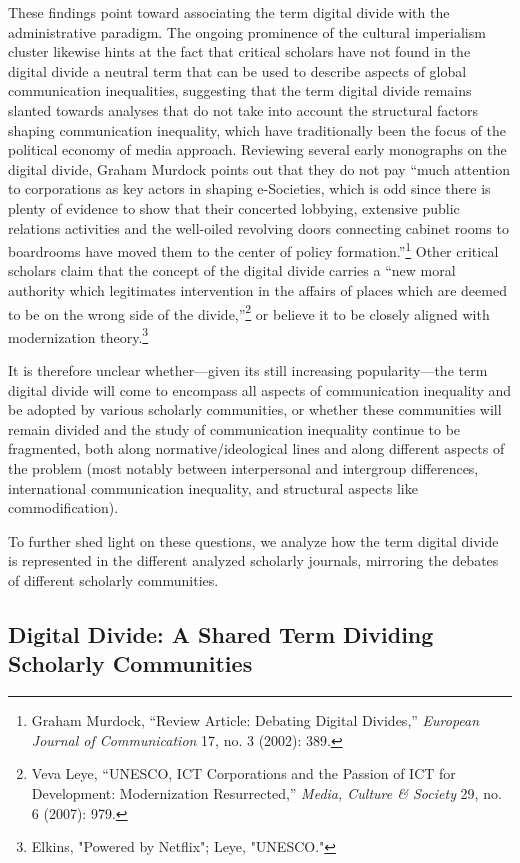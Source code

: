 \documentclass{tufte-handout}
\begin{document}
These findings point toward associating the term digital divide with the
administrative paradigm. The ongoing prominence of the cultural
imperialism cluster likewise hints at the fact that critical scholars
have not found in the digital divide a neutral term that can be used to
describe aspects of global communication inequalities, suggesting that
the term digital divide remains slanted towards analyses that do not
take into account the structural factors shaping communication
inequality, which have traditionally been the focus of the political
economy of media approach. Reviewing several early monographs on the
digital divide, Graham Murdock points out that they do not pay ``much
attention to corporations as key actors in shaping e-Societies, which is
odd since there is plenty of evidence to show that their concerted
lobbying, extensive public relations activities and the well-oiled
revolving doors connecting cabinet rooms to boardrooms have moved them
to the center of policy formation.''\footnote{Graham Murdock, ``Review
  Article: Debating Digital Divides,'' \emph{European Journal of
  Communication} 17, no. 3 (2002): 389.} Other critical scholars claim
that the concept of the digital divide carries a ``new moral authority
which legitimates intervention in the affairs of places which are deemed
to be on the wrong side of the divide,''\footnote{Veva Leye, ``UNESCO,
  ICT Corporations and the Passion of ICT for Development: Modernization
  Resurrected,'' \emph{Media, Culture \& Society} 29, no. 6 (2007): 979.}
or believe it to be closely aligned with modernization
theory.\footnote{Elkins, "Powered by Netflix"; Leye, "UNESCO."}

It is therefore unclear whether---given its still increasing
popularity---the term digital divide will come to encompass all aspects
of communication inequality and be adopted by various scholarly
communities, or whether these communities will remain divided and the
study of communication inequality continue to be fragmented, both along
normative/ideological lines and along different aspects of the problem
(most notably between interpersonal and intergroup differences,
international communication inequality, and structural aspects like
commodification).

To further shed light on these questions, we analyze how the term
digital divide is represented in the different analyzed scholarly
journals, mirroring the debates of different scholarly communities.

\hypertarget{digital-divide-a-shared-term-dividing-scholarly-communities}{%
\subsection{Digital Divide: A Shared Term
Dividing Scholarly
Communities}\label{digital-divide-a-shared-term-dividing-scholarly-communities}}
\end{document}
